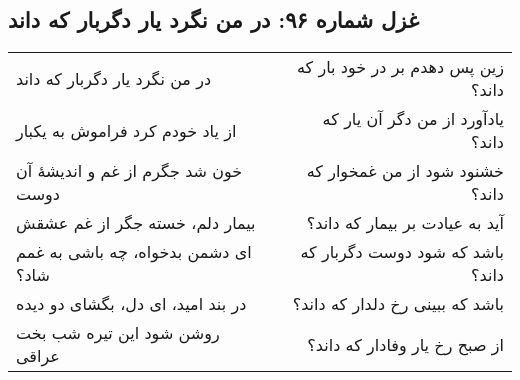 \begin{center}
\section*{غزل شماره ۹۶: در من نگرد یار دگربار که داند}
\label{sec:096}
\begin{longtable}{l p{0.5cm} r}
در من نگرد یار دگربار که داند
&&
زین پس دهدم بر در خود بار که داند؟
\\
از یاد خودم کرد فراموش به یکبار
&&
یادآورد از من دگر آن یار که داند؟
\\
خون شد جگرم از غم و اندیشهٔ آن دوست
&&
خشنود شود از من غمخوار که داند؟
\\
بیمار دلم، خسته جگر از غم عشقش
&&
آید به عیادت بر بیمار که داند؟
\\
ای دشمن بدخواه، چه باشی به غمم شاد؟
&&
باشد که شود دوست دگربار که داند؟
\\
در بند امید، ای دل، بگشای دو دیده
&&
باشد که ببینی رخ دلدار که داند؟
\\
روشن شود این تیره شب بخت عراقی
&&
از صبح رخ یار وفادار که داند؟
\\
\end{longtable}
\end{center}
